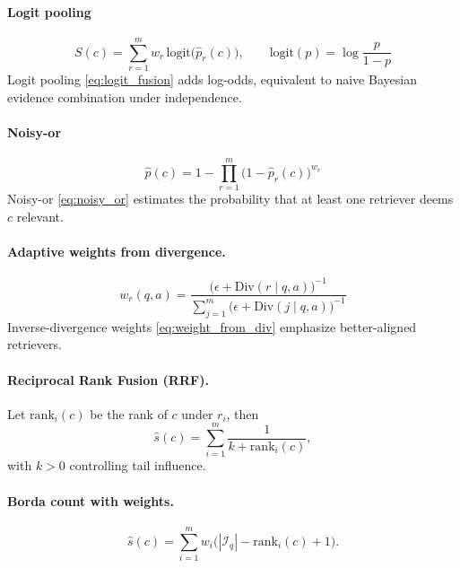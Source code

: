 \documentclass{article}
\theoremstyle{plain}
\theoremstyle{definition}
\theoremstyle{remark}
\begin{document}
\paragraph{Logit pooling}
\begin{equation}
S(c)=\sum_{r=1}^m w_r\,\mathrm{logit}\!\big(\hat{p}_r(c)\big),\qquad \mathrm{logit}(p)=\log\frac{p}{1-p}
\label{eq:logit_fusion}
\end{equation}
Logit pooling \eqref{eq:logit_fusion} adds log-odds, equivalent to naive Bayesian evidence combination under independence.

\paragraph{Noisy-or}
\begin{equation}
\hat{p}(c)=1-\prod_{r=1}^m \big(1-\hat{p}_r(c)\big)^{w_r}
\label{eq:noisy_or}
\end{equation}
Noisy-or \eqref{eq:noisy_or} estimates the probability that at least one retriever deems \(c\) relevant.



\paragraph{Adaptive weights from divergence.}
\begin{equation}
w_r(q,a)=\frac{\big(\epsilon+\mathrm{Div}(r\mid q,a)\big)^{-1}}{\sum_{j=1}^m \big(\epsilon+\mathrm{Div}(j\mid q,a)\big)^{-1}}
\label{eq:weight_from_div}
\end{equation}
Inverse-divergence weights \eqref{eq:weight_from_div} emphasize better-aligned retrievers.





\paragraph{Reciprocal Rank Fusion (RRF).}
Let $\mathrm{rank}_i(c)$ be the rank of $c$ under $r_i$, then
\begin{equation}
\hat{s}(c)=\sum_{i=1}^m \frac{1}{k+\mathrm{rank}_i(c)},
\end{equation}
with $k>0$ controlling tail influence.

\paragraph{Borda count with weights.}
\begin{equation}
\hat{s}(c)=\sum_{i=1}^m w_i\big(|\mathcal{I}_q|-\mathrm{rank}_i(c)+1\big).
\end{equation}
\end{document}
